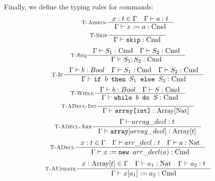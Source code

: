 \documentclass{article}
\begin{document}
Finally, we define the typing rules for commands:
\[
\inference[\textsc{T-Assign}]
    {x : t \in \Gamma \quad \Gamma \vdash a : t}
    {\Gamma \vdash  x := a : \text{Cmd}}{}
\]
\[
\inference[\textsc{T-Skip}]
    {}
    {\Gamma \vdash \texttt{skip} : \text{Cmd}}{}
\]
\[
\inference[\textsc{T-Seq}]
    {\Gamma \vdash S_1 : \text{Cmd} \quad \Gamma \vdash S_2 : \text{Cmd}}
    {\Gamma \vdash S_1; S_2 : \text{Cmd}}{}
\]
\[
\inference[\textsc{T-If}]
    {\Gamma \vdash b : Bool \quad \Gamma \vdash S_1 : \text{Cmd} \quad \Gamma \vdash S_2 : \text{Cmd}}
    {\Gamma \vdash \texttt{if } b \texttt{ then } S_1 \texttt{ else } S_2 : \text{Cmd}}{}
\]
\[
\inference[\textsc{T-While}]
    {\Gamma \vdash b : Bool \quad \Gamma \vdash S : \text{Cmd}}
    {\Gamma \vdash \texttt{while } b \texttt{ do } S : \text{Cmd}}{}
\]
\[
\inference[\textsc{T-ADecl-Int}]
    {}
    {\Gamma \vdash\texttt{array[int]} : \text{\text{Array}}[\text{Nat}]}{}
\]
\[
\inference[\textsc{T-ADecl-Arr}]
    {\Gamma \vdash array\_decl : t}
    {\Gamma \vdash \texttt{array}[array\_decl] : \text{\text{Array}}[t]}{}
\]
\[
\inference[\textsc{T-ADecl}]
    {x : t \in \Gamma \quad \Gamma \vdash arr\_decl : t \quad \Gamma \vdash a : \text{Nat}}
    {\Gamma \vdash x := \texttt{new }arr\_decl(a) : \text{Cmd}}{}
\]
\[
\inference[\textsc{T-AUpdate}]
    {x : \text{Array}[t] \in \Gamma \quad \Gamma \vdash a_1 : \text{Nat} \quad \Gamma \vdash a_2 : t}
    {\Gamma \vdash x[a_1] := a_2 : \text{Cmd}}{}
\]
\end{document}
